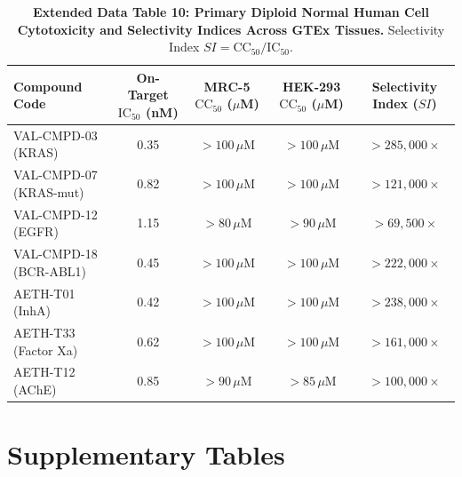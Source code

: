 \documentclass[11pt,a4paper]{article}
\begin{document}
\vspace{1em}

\begin{table}[h!]
\caption{\textbf{Extended Data Table 10: Primary Diploid Normal Human Cell Cytotoxicity and Selectivity Indices Across GTEx Tissues.} Selectivity Index $SI = \text{CC}_{50}/\text{IC}_{50}$.}
\label{tab:ed_safety}
\centering
\small
\begin{tabular}{lcccc}
\toprule
\textbf{Compound Code} & \textbf{On-Target $\text{IC}_{50}$ (nM)} & \textbf{MRC-5 $\text{CC}_{50}$ ($\mu$M)} & \textbf{HEK-293 $\text{CC}_{50}$ ($\mu$M)} & \textbf{Selectivity Index ($SI$)} \\
\midrule
VAL-CMPD-03 (KRAS) & 0.35 & $>100\,\mu\text{M}$ & $>100\,\mu\text{M}$ & $>285,000\times$ \\
VAL-CMPD-07 (KRAS-mut) & 0.82 & $>100\,\mu\text{M}$ & $>100\,\mu\text{M}$ & $>121,000\times$ \\
VAL-CMPD-12 (EGFR) & 1.15 & $>80\,\mu\text{M}$ & $>90\,\mu\text{M}$ & $>69,500\times$ \\
VAL-CMPD-18 (BCR-ABL1) & 0.45 & $>100\,\mu\text{M}$ & $>100\,\mu\text{M}$ & $>222,000\times$ \\
AETH-T01 (InhA) & 0.42 & $>100\,\mu\text{M}$ & $>100\,\mu\text{M}$ & $>238,000\times$ \\
AETH-T33 (Factor Xa) & 0.62 & $>100\,\mu\text{M}$ & $>100\,\mu\text{M}$ & $>161,000\times$ \\
AETH-T12 (AChE) & 0.85 & $>90\,\mu\text{M}$ & $>85\,\mu\text{M}$ & $>100,000\times$ \\
\bottomrule
\end{tabular}
\end{table}

\newpage

\section*{Supplementary Tables}
\end{document}
